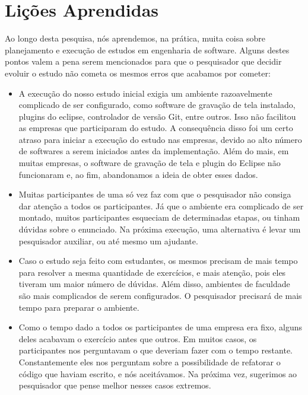 \section{Lições Aprendidas}

Ao longo desta pesquisa, nós aprendemos, na prática, muita coisa sobre planejamento
e execução de estudos em engenharia de software. Alguns destes pontos valem
a pena serem mencionados para que o pesquisador que decidir evoluir o estudo
não cometa os mesmos erros que acabamos por cometer:

\begin{itemize}
	
	\item A execução do nosso estudo inicial exigia um ambiente razoavelmente
	complicado de ser configurado, como software de gravação de tela instalado, plugins do eclipse,
	controlador de versão Git, entre outros. Isso não facilitou as empresas que participaram
	do estudo. A consequência disso foi um certo atraso para iniciar a execução do estudo nas empresas, 
	devido ao alto número de softwares a serem iniciados antes da implementação. Além do mais, em muitas empresas,
	o software de gravação de tela e plugin do Eclipse não funcionaram e, ao fim, abandonamos a ideia de
	obter esses dados.
	
	\item Muitas participantes de uma só vez faz com que o pesquisador não consiga dar atenção
	a todos os participantes. Já que o ambiente era complicado de ser montado, muitos participantes
	esqueciam de determinadas etapas, ou tinham dúvidas sobre o enunciado. Na próxima execução,
	uma alternativa é levar um pesquisador auxiliar, ou até mesmo um ajudante.
	
	\item Caso o estudo seja feito com estudantes, os mesmos precisam de mais tempo para resolver
	a mesma quantidade de exercícios, e mais atenção, pois eles tiveram um maior número
	de dúvidas. Além disso, ambientes de faculdade são mais complicados de serem configurados.
	O pesquisador precisará de mais tempo para preparar o ambiente.
	
	\item Como o tempo dado a todos os participantes de uma empresa era fixo, alguns deles
	acabavam o exercício antes que outros. Em muitos casos, os participantes nos perguntavam
	o que deveriam fazer com o tempo restante. Constantemente eles nos perguntam sobre a possibilidade
	de refatorar o código que haviam escrito, e nós aceitávamos. Na próxima vez, sugerimos
	ao pesquisador que pense melhor nesses casos extremos.
	

\end{itemize}
